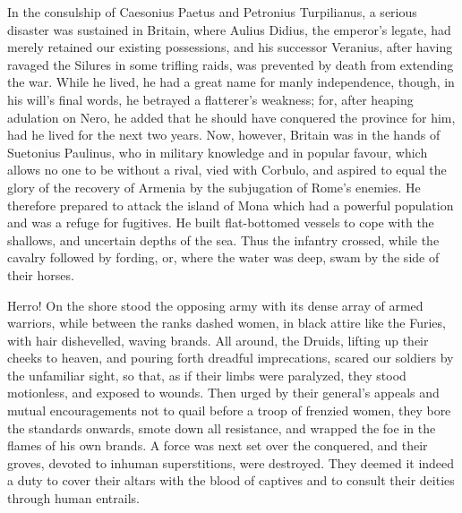 
In the consulship of Caesonius Paetus and Petronius Turpilianus, a serious disaster was sustained in Britain, where Aulius Didius, the emperor's legate, had merely retained our existing possessions, and his successor Veranius, after having ravaged the Silures in some trifling raids, was prevented by death from extending the war. While he lived, he had a great name for manly independence, though, in his will's final words, he betrayed a flatterer's weakness; for, after heaping adulation on Nero, he added that he should have conquered the province for him, had he lived for the next two years. Now, however, Britain was in the hands of Suetonius Paulinus, who in military knowledge and in popular favour, which allows no one to be without a rival, vied with Corbulo, and aspired to equal the glory of the recovery of Armenia by the subjugation of Rome's enemies. He therefore prepared to attack the island of Mona which had a powerful population and was a refuge for fugitives. He built flat-bottomed vessels to cope with the shallows, and uncertain depths of the sea. Thus the infantry crossed, while the cavalry followed by fording, or, where the water was deep, swam by the side of their horses.


Herro! On the shore stood the opposing army with its dense array of armed warriors, while between the ranks dashed women, in black attire like the Furies, with hair dishevelled, waving brands. All around, the Druids, lifting up their cheeks to heaven, and pouring forth dreadful imprecations, scared our soldiers by the unfamiliar sight, so that, as if their limbs were paralyzed, they stood motionless, and exposed to wounds. Then urged by their general's appeals and mutual encouragements not to quail before a troop of frenzied women, they bore the standards onwards, smote down all resistance, and wrapped the foe in the flames of his own brands. A force was next set over the conquered, and their groves, devoted to inhuman superstitions, were destroyed. They deemed it indeed a duty to cover their altars with the blood of captives and to consult their deities through human entrails.


